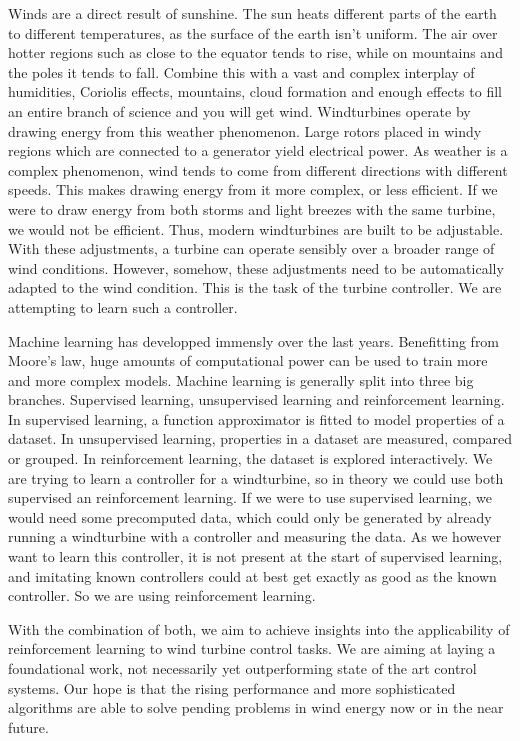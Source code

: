 \documentclass[hyperref,beleg]{cgvpub}
\begin{document}
Winds are a direct result of sunshine. The sun heats different parts of the earth to different temperatures, as the surface of the earth isn't uniform. The air over hotter regions such as close to the equator tends to rise, while on mountains and the poles it tends to fall. Combine this with a vast and complex interplay of humidities, Coriolis effects, mountains, cloud formation and enough effects to fill an entire branch of science and you will get wind. Windturbines operate by drawing energy from this weather phenomenon. Large rotors placed in windy regions which are connected to a generator yield electrical power. As weather is a complex phenomenon, wind tends to come from different directions with different speeds. This makes drawing energy from it more complex, or less efficient. If we were to draw energy from both storms and light breezes with the same turbine, we would not be efficient. Thus, modern windturbines are built to be adjustable. With these adjustments, a turbine can operate sensibly over a broader range of wind conditions. However, somehow, these adjustments need to be automatically adapted to the wind condition. This is the task of the turbine controller. We are attempting to learn such a controller.

Machine learning has developped immensly over the last years. Benefitting from Moore's law, huge amounts of computational power can be used to train more and more complex models. Machine learning is generally split into three big branches. Supervised learning, unsupervised learning and reinforcement learning. In supervised learning, a function approximator is fitted to model properties of a dataset. In unsupervised learning, properties in a dataset are measured, compared or grouped. In reinforcement learning, the dataset is explored interactively. We are trying to learn a controller for a windturbine, so in theory we could use both supervised an reinforcement learning. If we were to use supervised learning, we would need some precomputed data, which could only be generated by already running a windturbine with a controller and measuring the data. As we however want to learn this controller, it is not present at the start of supervised learning, and imitating known controllers could at best get exactly as good as the known controller. So we are using reinforcement learning.

With the combination of both, we aim to achieve insights into the applicability of reinforcement learning to wind turbine control tasks. We are aiming at laying a foundational work, not necessarily yet outperforming state of the art control systems. Our hope is that the rising performance and more sophisticated algorithms are able to solve pending problems in wind energy now or in the near future.
\end{document}
